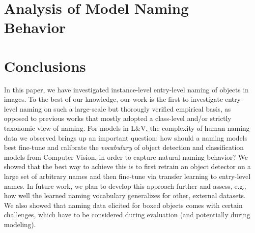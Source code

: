 \documentclass[11pt,a4paper]{article}
\newcommand{\lv}{L\&V\xspace}
\newcommand{\arbitrary}{arbitrary\xspace}
\begin{document}
\section{Analysis of Model Naming Behavior}
\label{sec:analysis}


\section{Conclusions}
\label{sec:conclusions}
In this paper, we have investigated instance-level entry-level naming of objects in images.
To the best of our knowledge, our work is the first to investigate entry-level naming on such a large-scale but thorougly verified empirical basis, 
as opposed to previous works that mostly adopted a class-level and/or strictly taxonomic view of naming.
For models in \lv, the complexity of human naming data we observed brings up an important question: how should a naming models best fine-tune and calibrate the \textit{vocabulary} of object detection and classification models from Computer Vision, in order to capture natural naming behavior?
We showed that the best way to achieve this is to first retrain an object detector on a large set of \arbitrary names and then fine-tune via transfer learning to entry-level names. 
In future work, we plan to develop this approach further and assess, e.g., how well the learned naming vocabulary generalizes for other, external datasets.
We also showed that naming data elicited for boxed objects comes with certain challenges, which have to be considered during evaluation (and potentially during modeling). 

%
%

%
\end{document}

